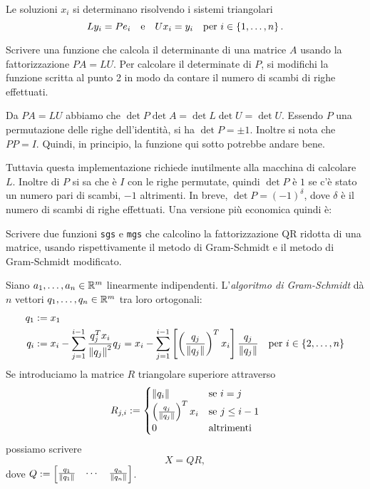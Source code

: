Le soluzioni \(x_i\) si determinano risolvendo i sistemi triangolari
\[Ly_i = Pe_i \quad\text{e}\quad Ux_i = y_i \quad\text{per } i \in \left\{1, \dots{}, n\right\} .\]



\begin{esercizio}
Scrivere una funzione che calcola il determinante di una matrice \(A\) usando la fattorizzazione \(PA = LU\). Per calcolare il determinate di \(P\), si modifichi la funzione scritta al punto 2 in modo da contare il numero di scambi di righe effettuati.
\end{esercizio}

Da \(PA = LU\) abbiamo che \(\det P \det A = \det L \det U = \det U\). Essendo \(P\) una permutazione delle righe dell'identità, si ha \(\det P = \pm 1\). Inoltre si nota che \(P P = I\). Quindi, in principio, la funzione qui sotto potrebbe andare bene.



Tuttavia questa implementazione richiede inutilmente alla macchina di calcolare \(L\). Inoltre di \(P\) si sa che è \(I\) con le righe permutate, quindi \(\det P\) è \(1\) se c'è stato un numero pari di scambi, \(-1\) altrimenti. In breve, \(\det P = (-1)^\delta\), dove \(\delta\) è il numero di scambi di righe effettuati. Una versione più economica quindi è:




\begin{esercizio}
Scrivere due funzioni \lstinline£sgs£ e \lstinline£mgs£ che calcolino la fattorizzazione QR ridotta di una matrice, usando rispettivamente il metodo di Gram-Schmidt e il metodo di Gram-Schmidt modificato.
\end{esercizio}

Siano \(a_1, \dots{}, a_n \in \mathbb R^m\) linearmente indipendenti. L'{\em algoritmo di Gram-Schmidt} dà \(n\) vettori \(q_1, \dots{}, q_n \in \mathbb R^m\) tra loro ortogonali:
\begin{align*}
q_1 & := x_1 \\
q_i & := x_i - \sum_{j=1}^{i-1} \frac{q_j^T x_i}{\left\lVert q_j \right\rVert^2} q_j = x_i - \sum_{j=1}^{i-1} \left[\left(\frac{q_j}{\left\lVert q_j \right\rVert}\right)^T x_i \right] \frac{q_j}{\left\lVert q_j \right\rVert} \quad\text{per } i \in \left\{2, \dots{}, n\right\}
\end{align*}
%
%
Se introduciamo la matrice \(R\) triangolare superiore attraverso
\[R_{j,i} := \begin{cases} \left\lVert q_i \right\rVert & \text{se } i= j \\ \left(\frac{q_j}{\left\lVert q_j \right\rVert}\right)^T x_i & \text{se } j \le i-1 \\ 0 & \text{altrimenti} \end{cases}\]
possiamo scrivere
\[X = Q R ,\]
dove \(Q := \begin{bmatrix} \frac{q_1}{\left\lVert q_1 \right\rVert} & \cdots{} & \frac{q_n}{\left\lVert q_n \right\rVert} \end{bmatrix}\).

